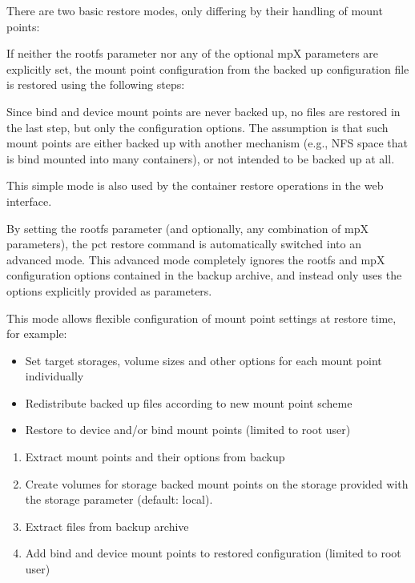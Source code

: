 There are two basic restore modes, only differing by their handling of mount points:

If neither the rootfs parameter nor any of the optional mpX parameters are explicitly set, the mount point configuration from the backed up configuration file is restored using the following steps:

Since bind and device mount points are never backed up, no files are restored in the last step, but only the configuration options. The assumption is that such mount points are either backed up with another mechanism (e.g., NFS space that is bind mounted into many containers), or not intended to be backed up at all.

This simple mode is also used by the container restore operations in the web interface.

By setting the rootfs parameter (and optionally, any combination of mpX parameters), the pct restore command is automatically switched into an advanced mode. This advanced mode completely ignores the rootfs and mpX configuration options contained in the backup archive, and instead only uses the options explicitly provided as parameters.

This mode allows flexible configuration of mount point settings at restore time, for example:

\begin{itemize}[leftmargin=2cm]

	\item Set target storages, volume sizes and other options for each mount point individually

	\item Redistribute backed up files according to new mount point scheme

	\item Restore to device and/or bind mount points (limited to root user)

\end{itemize}

\begin{enumerate}[leftmargin=2cm]

	\item Extract mount points and their options from backup

	\item Create volumes for storage backed mount points on the storage provided with the storage parameter (default: local).

	\item Extract files from backup archive

	\item Add bind and device mount points to restored configuration (limited to root user)

\end{enumerate}


